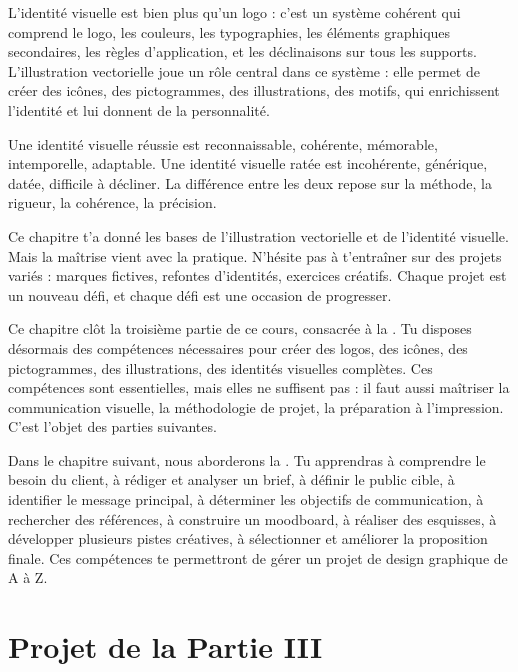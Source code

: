L'identité visuelle est bien plus qu'un logo : c'est un système cohérent qui comprend le logo, les couleurs, les typographies, les éléments graphiques secondaires, les règles d'application, et les déclinaisons sur tous les supports. L'illustration vectorielle joue un rôle central dans ce système : elle permet de créer des icônes, des pictogrammes, des illustrations, des motifs, qui enrichissent l'identité et lui donnent de la personnalité.

Une identité visuelle réussie est reconnaissable, cohérente, mémorable, intemporelle, adaptable. Une identité visuelle ratée est incohérente, générique, datée, difficile à décliner. La différence entre les deux repose sur la méthode, la rigueur, la cohérence, la précision.

Ce chapitre t'a donné les bases de l'illustration vectorielle et de l'identité visuelle. Mais la maîtrise vient avec la pratique. N'hésite pas à t'entraîner sur des projets variés : marques fictives, refontes d'identités, exercices créatifs. Chaque projet est un nouveau défi, et chaque défi est une occasion de progresser.

Ce chapitre clôt la troisième partie de ce cours, consacrée à la . Tu disposes désormais des compétences nécessaires pour créer des logos, des icônes, des pictogrammes, des illustrations, des identités visuelles complètes. Ces compétences sont essentielles, mais elles ne suffisent pas : il faut aussi maîtriser la communication visuelle, la méthodologie de projet, la préparation à l'impression. C'est l'objet des parties suivantes.

Dans le chapitre suivant, nous aborderons la . Tu apprendras à comprendre le besoin du client, à rédiger et analyser un brief, à définir le public cible, à identifier le message principal, à déterminer les objectifs de communication, à rechercher des références, à construire un moodboard, à réaliser des esquisses, à développer plusieurs pistes créatives, à sélectionner et améliorer la proposition finale. Ces compétences te permettront de gérer un projet de design graphique de A à Z.

\section*{Projet de la Partie III}

